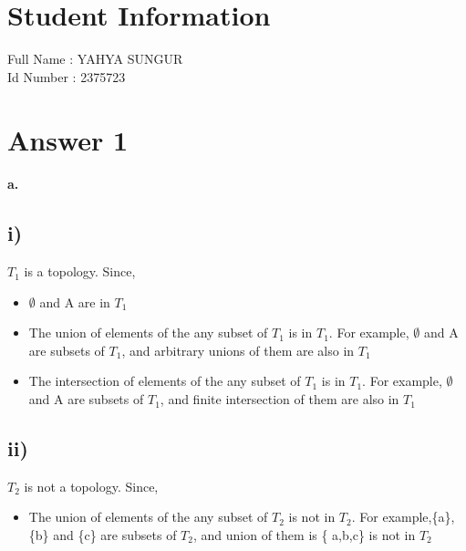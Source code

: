 \documentclass[11pt]{article}
\begin{document}
\section*{Student Information } 
Full Name : YAHYA SUNGUR \\
Id Number : 2375723 
\section*{Answer 1}
\paragraph{a.}
\subsection*{i)}
$T_1$ is a topology. Since,
\begin{itemize}
    \item $\emptyset$ and A are in $T_1$
    \item The union of elements of the any subset of $T_1$ is in $T_1$. For example, $\emptyset$ and A are subsets of $T_1$, and arbitrary unions of them are also in $T_1$
    \item The intersection of elements of the any subset of $T_1$ is in $T_1$. For example, $\emptyset$ and A are subsets of $T_1$, and finite intersection of them are also in $T_1$
\end{itemize}
\subsection*{ii)}
$T_2$ is not a topology. Since,
\begin{itemize}
    \item The union of elements of the any subset of $T_2$ is not in $T_2$. For example,\{a\},\{b\} and \{c\} are subsets of $T_2$, and union of them is  \{ a,b,c\} is not in $T_2$
\end{itemize}
\end{document}
